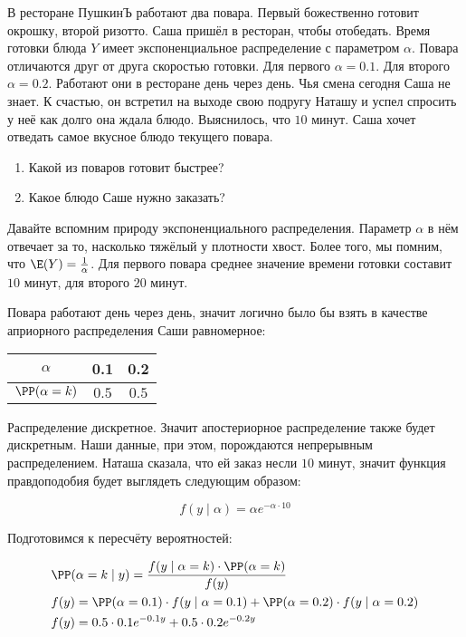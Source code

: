 \begin{problem}
	
В ресторане ПушкинЪ работают два повара. Первый божественно готовит окрошку, второй ризотто.  Саша пришёл в ресторан, чтобы отобедать. Время готовки блюда $Y$ имеет экспоненциальное распределение с параметром $\alpha$.  Повара отличаются друг от друга скоростью готовки.  Для первого $\alpha = 0.1$. Для второго $\alpha = 0.2$. Работают они в ресторане день через день. Чья смена сегодня Саша не знает.  К счастью, он встретил на выходе свою подругу Наташу и успел спросить у неё как долго она ждала блюдо. Выяснилось, что $10$ минут.  Саша хочет отведать самое вкусное блюдо текущего повара. 

\begin{enumerate}
	\item  Какой из поваров готовит быстрее? 
	\item  Какое блюдо Саше нужно заказать? 
\end{enumerate}

	\begin{sol}
		Давайте вспомним природу экспоненциального распределения. Параметр $\alpha$ в нём отвечает за то, насколько тяжёлый у плотности хвост.  Более того, мы помним, что $\E(Y) = \frac{1}{\alpha}$. Для первого повара среднее значение времени готовки составит $10$ минут, для второго $20$ минут. 
		
		Повара работают день через день, значит логично было бы взять в качестве априорного распределения Саши равномерное: 
		
		\begin{center}
			\begin{tabular}{c|c|c}
				$\alpha$ & 0.1 & 0.2 \\ \hline
				$\PP(\alpha= k)$ & $0.5$ & $0.5$ \\ 
			\end{tabular}
		\end{center}
		
		Распределение дискретное. Значит апостериорное распределение также будет дискретным. Наши данные, при этом, порождаются непрерывным распределением. Наташа сказала, что ей заказ несли $10$ минут, значит функция правдоподобия будет выглядеть следующим образом: 
		
		\[ f(y \mid \alpha) = \alpha e^{-\alpha \cdot 10} \]
		
		Подготовимся к пересчёту вероятностей: 
		
		\begin{equation*}
		\begin{aligned}
		&\PP(\alpha = k \mid y) = \frac{f(y \mid \alpha = k) \cdot \PP(\alpha =k)}{f(y)} \\
		&f(y) = \PP(\alpha = 0.1) \cdot f(y \mid \alpha = 0.1) + \PP(\alpha = 0.2) \cdot f(y \mid \alpha = 0.2) \\
		&f(y) = 0.5 \cdot 0.1 e^{-0.1 y}  +  0.5 \cdot 0.2 e^{-0.2 y} \\
		\end{aligned}
		\end{equation*}
		

\end{sol}
\end{problem}
